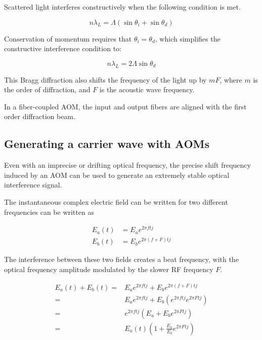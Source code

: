 Scattered light interferes constructively when the following condition is met.

\begin{equation} \label{eq:constructive_interference}
n \lambda_L = \Lambda (\sin{\theta_i} + \sin{\theta_d})
\end{equation}

Conservation of momentum requires that $\theta_i = \theta_d$, which simplifies the constructive interference condition to:

\begin{equation}
n \lambda_L = 2 \Lambda \sin{\theta_d}
\end{equation}

This Bragg diffraction also shifts the frequency of the light up by $mF$, where $m$ is the order of diffraction, and $F$ is the acoustic wave frequency. \cite{haus}

In a fiber-coupled AOM, the input and output fibers are aligned with the first order diffraction beam.

\subsection{Generating a carrier wave with AOMs}
\label{sec:aom_carrier}

Even with an imprecise or drifting optical frequency, the precise shift frequency induced by an AOM can be used to generate an extremely stable optical interference signal. \cite{hitzenberger}

The instantaneous complex electric field can be written for two different frequencies can be written as

\begin{align}
E_a(t) & = E_a e^{2 \pi ft j} \\
E_b(t) & = E_b e^{2 \pi (f + F)t j}
\end{align}

The interference between these two fields creates a beat frequency, with the optical frequency amplitude modulated by the slower RF frequency $F$.

\begin{align}
E_a(t) + E_b(t) = & E_a e^{2 \pi ftj} + E_b e^{2 \pi (f + F)t j} \\
= & E_a e^{2 \pi ft j} + E_b (e^{2 \pi ftj} e^{2 \pi Ftj}) \\
= & e^{2 \pi ftj} (E_a + E_b e^{2 \pi Ftj}) \\
= & E_a(t) (1 + \frac{E_a}{E_b} e^{2 \pi Ftj})
\end{align}

